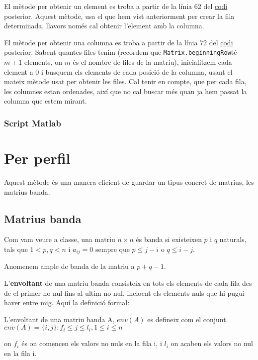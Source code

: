 \documentclass[11pt,a4paper,twoside]{report}
\begin{document}
	El mètode per obtenir un element es troba a partir de la línia 62 del \hyperref[sec:codi1]{codi} posterior. Aquest mètode, usa el que hem vist anteriorment per crear la fila determinada, llavors només cal obtenir l'element amb la columna.
	
	El mètode per obtenir una columna es troba a partir de la línia 72 del \hyperref[sec:codi1]{codi} posterior. Sabent quantes files tenim (recordem que \texttt{Matrix.beginningRow}té $m+1$ elements, on $m$ és el nombre de files de la matriu), inicialitzem cada element a 0 i busquem els elements de cada posició de la columna, usant el mateix mètode usat per obtenir les files. Cal tenir en compte, que per cada fila, les columnes estan ordenades, així que no cal buscar més quan ja hem passat la columna que estem mirant.
	
	
	\subsubsection{Script Matlab}
	\label{sec:codi1}
	
	
	
	
	\section{Per perfil}
	
	 
	 Aquest mètode és una manera eficient de guardar un tipus concret de matrius, les matrius banda.
	 
	\subsection{Matrius banda}	 
	
	Com vam veure a classe, 
	una matriu $n \times n$ és banda si existeixen $p$ i $q$ naturals, tals que $1< p, q < n$  i $a_{i j} = 0$ sempre que $p \leq j - i$ o $q \leq i-j$. 
	
	Anomenem ample de banda de la matriu a $p + q - 1$.
	
	L'\textbf{envoltant} de una matriu banda consisteix en tots els elements de cada fila des de el primer no nul fins al ultim no nul, incloent els elements nuls que hi pugui haver entre mig.  Aquí la definició formal:
	
	L'envoltant de una matriu banda A, $env(A)$ es defineix com el conjunt $env(A) = \{i, j\} : f_i \leq j \leq l_i, 1 \leq i \leq n $ 
	
	on $f_i$ és on comencen els valors no nuls en la fila i, i $l_i$ on acaben els valors no nul en la fila i.
	
\end{document}
